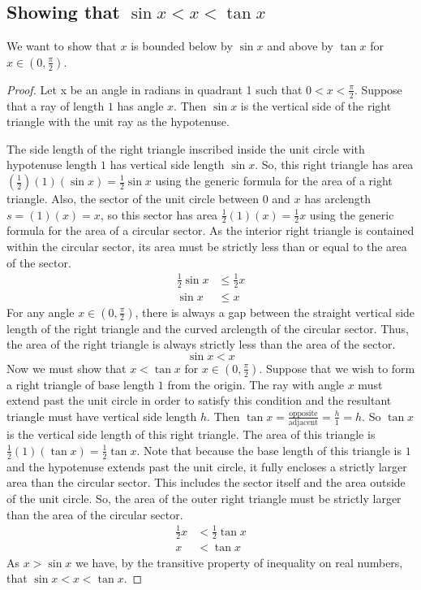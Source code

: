 \documentclass[11pt,reqno, tikz, border=3mm]{amsart}
\theoremstyle{plain}
\theoremstyle{definition}
\theoremstyle{remark}
\begin{document}
\subsection{Showing that $\sin x < x < \tan x$}
We want to show that $x$ is bounded below by $\sin x$ and above by $\tan x$ for $x \in (0,\frac{\pi}{2})$.
\begin{proof}
Let x be an angle in radians in quadrant 1 such that $0 < x < \frac{\pi}{2}$. Suppose that a ray of length $1$ has angle $x$. Then $\sin x$ is the vertical side of the right triangle with the unit ray as the hypotenuse. 

The side length of the right triangle inscribed inside the unit circle with hypotenuse length $1$ has vertical side length $\sin x$. So, this right triangle has area $(\frac{1}{2})(1)(\sin x) = \frac{1}{2} \sin x$ using the generic formula for the area of a right triangle. Also, the sector of the unit circle between $0$ and $x$ has arclength $s=(1)(x)=x$, so this sector has area $\frac{1}{2}(1)(x) = \frac{1}{2}x$ using the generic formula for the area of a circular sector. As the interior right triangle is contained within the circular sector, its area must be strictly less than or equal to the area of the sector.
\begin{align} 
\frac{1}{2} \sin x &\le \frac{1}{2}x \\
\sin x &\le x
\end{align}
For any angle $x \in (0, \frac{\pi}{2})$, there is always a gap between the straight vertical side length of the right triangle and the curved arclength of the circular sector. Thus, the area of the right triangle is always strictly less than  the area of the sector.
$$
\sin x < x
$$
Now we must show that $x < \tan x$ for $x \in (0, \frac{\pi}{2})$. Suppose that we wish to form a right triangle of base length $1$ from the origin. The ray with angle $x$ must extend past the unit circle in order to satisfy this condition and the resultant triangle must have vertical side length $h$. Then $\tan x = \frac{\text{opposite}}{\text{adjacent}} = \frac{h}{1} = h$. So $\tan x$ is the vertical side length of this right triangle. The area of this triangle is $\frac{1}{2}(1)(\tan x) = \frac{1}{2}\tan x$. Note that because the base length of this triangle is $1$ and the hypotenuse extends past the unit circle, it fully encloses a strictly larger area than the circular sector. This includes the sector itself and the area outside of the unit circle. So, the area of the outer right triangle must be strictly larger than the area of the circular sector.
\begin{align}
 \frac{1}{2}x &< \frac{1}{2}\tan x \\
 x &< \tan x
\end{align}
As  $x > \sin x$ we have, by the transitive property of inequality on real numbers, that $\sin x < x < \tan x$.

\end{proof}
\end{document}
